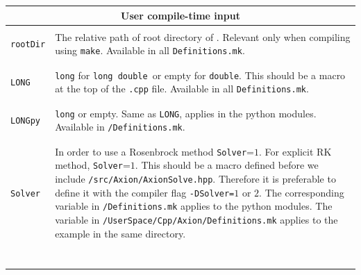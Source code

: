 \documentclass[11pt,a4paper]{article}
\begin{document}
\begin{table}[h!]
	\centering
	\begin{tabular}{l l}
		\multicolumn{2}{c}{\bf User compile-time input}  \\
		\hline\\[-0.4cm]

		{\tt rootDir}& \multirow{1}{12cm}{The relative path of root directory of \mimes. Relevant only when compiling using {\tt make}. Available in all {\tt Definitions.mk}.}\\\\		
		\hline\\[-0.4cm]
		
		{\tt LONG}& \multirow{1}{12cm}{{\tt long} for {\tt long double }or empty for {\tt double}. This should be a macro at the top of the {\tt .cpp} file. Available in all {\tt Definitions.mk}.}\\\\		
		\hline\\[-0.4cm]

		{\tt LONGpy}& \multirow{1}{12cm}{{\tt long} or empty. Same as {\tt LONG}, applies in the python modules. Available in {\tt \mimes/Definitions.mk}.}\\\\		
		\hline\\[-0.4cm]

		{\tt Solver}& \multirow{1}{12cm}{In order to use a Rosenbrock method {\tt Solver}=$1$. For explicit RK method, {\tt Solver}=$1$. 
		This should be a macro defined before we include {\tt \mimes/src/Axion/AxionSolve.hpp}. Therefore it is preferable to 
		define it with the compiler flag {\tt -DSolver=}$1$ or $2$. The corresponding variable in {\tt \mimes/Definitions.mk} applies to the python modules. The variable in {\tt \mimes/UserSpace/Cpp/Axion/Definitions.mk} applies to the example in the same directory.}\\\\\\\\\\\\\\		
		\hline\\[-0.4cm]


\end{tabular}
\end{table}
\end{document}
